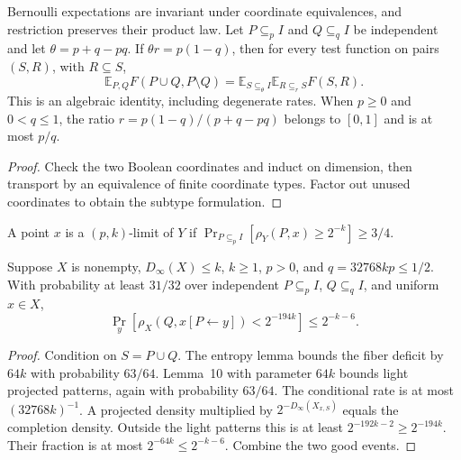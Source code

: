 \begin{theorem}
  \label{thm:analysis-conditional-sampling}
  \leanok
  Bernoulli expectations are invariant under coordinate equivalences, and
  restriction preserves their product law. Let $P\subseteq_p I$ and
  $Q\subseteq_q I$ be independent and let $\theta=p+q-pq$.
  If $\theta r=p(1-q)$, then for every test function on pairs $(S,R)$,
  with $R\subseteq S$,
  \[
    \mathbb E_{P,Q}F(P\cup Q,P\setminus Q)
      =\mathbb E_{S\subseteq_\theta I}\mathbb E_{R\subseteq_r S}F(S,R).
  \]
  This is an algebraic identity, including degenerate rates. When
  $p\ge0$ and $0<q\le1$, the ratio $r=p(1-q)/(p+q-pq)$ belongs to
  $[0,1]$ and is at most $p/q$.
\end{theorem}
\begin{proof}
  \leanok
  Check the two Boolean coordinates and induct on dimension, then
  transport by an equivalence of finite coordinate types. Factor out
  unused coordinates to obtain the subtype formulation.
\end{proof}

\begin{definition}
  \label{def:analysis-density-limit}
  \leanok
  A point $x$ is a $(p,k)$-limit of $Y$ if
  $\Pr_{P\subseteq_p I}[\rho_Y(P,x)\ge2^{-k}]\ge3/4$.
\end{definition}

\begin{lemma}
  \label{lem:analysis-mirror-completion}
  \leanok
  Suppose $X$ is nonempty, $D_\infty(X)\le k$, $k\ge1$, $p>0$, and
  $q=32768kp\le1/2$. With probability at least $31/32$ over independent
  $P\subseteq_p I$, $Q\subseteq_q I$, and uniform $x\in X$,
  \[
    \Pr_y[\rho_X(Q,x[P\leftarrow y])<2^{-194k}]\le2^{-k-6}.
  \]
\end{lemma}
\begin{proof}
  \leanok
  Condition on $S=P\cup Q$. The entropy lemma bounds the fiber deficit
  by $64k$ with probability $63/64$. Lemma~10 with parameter $64k$
  bounds light projected patterns, again with probability $63/64$.
  The conditional rate is at most $(32768k)^{-1}$.
  A projected density multiplied by $2^{-D_\infty(X_{x,S})}$ equals
  the completion density. Outside the light patterns this is at least
  $2^{-192k-2}\ge2^{-194k}$. Their fraction is at most
  $2^{-64k}\le2^{-k-6}$. Combine the two good events.
\end{proof}

